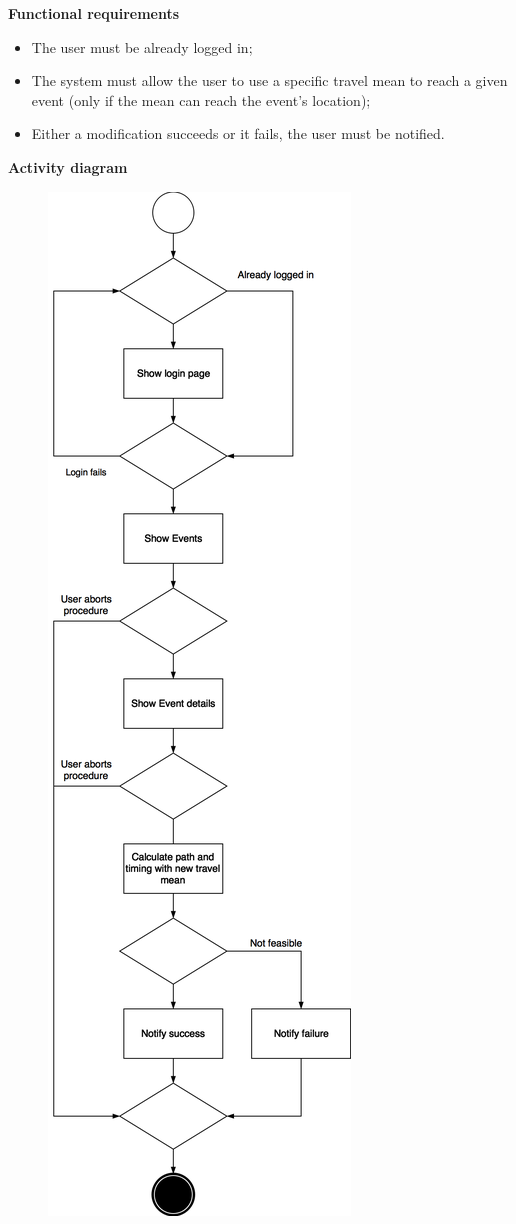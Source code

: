 \documentclass{article}
\begin{document}
	\bigskip
	\noindent
	\textbf{Functional requirements} \\
	\begin{itemize}
		\item The user must be already logged in;
		\item The system must allow the user to use a specific travel mean to reach a given event (only if the mean can reach the event's location);
		\item Either a modification succeeds or it fails, the user must be notified.
	\end{itemize}
	
	\newpage
	\noindent
	\textbf{Activity diagram} \\
	
	\begin{figure}[h!]
		\bigskip
		\centering
		\includegraphics[scale=0.23]{img/diagrams/provide_constraints_ad.png}

\end{figure}
\end{document}
